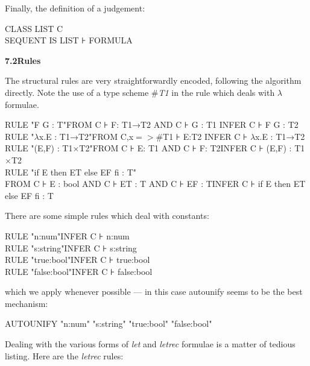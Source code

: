 Finally, the definition of a judgement:

CLASS LIST C\\
SEQUENT IS LIST ⊦ FORMULA


\textbf{7.2\tab Rules}


The structural rules are very straightforwardly encoded, following the algorithm directly. Note the use of a type scheme \#\textit{T1} in the rule which deals with \ensuremath{\lambda} formulae.

RULE "F G : T"\tab FROM C ⊦ F: T1→T2 AND C ⊦ G : T1 \tab INFER C ⊦ F G : T2\\
RULE "$\lambda$x.E : T1→T2"\tab FROM C,x$=>$\#T1 ⊦ E:T2 \tab INFER C ⊦ $\lambda$x.E : T1→T2\\
RULE "(E,F) : T1$\times$T2"\tab FROM C ⊦ E: T1 AND C ⊦ F: T2\tab INFER C ⊦ (E,F) : T1$\times$T2\\
RULE "if E then ET else EF fi : T"\\
\tab FROM C ⊦ E : bool AND C ⊦ ET : T AND C ⊦ EF : T\tab INFER C ⊦ if E then ET else EF fi : T


There are some simple rules which deal with constants:

RULE "n:num"\tab INFER C ⊦ n:num\\
RULE "s:string"\tab INFER C ⊦ s:string\\
RULE "true:bool"\tab INFER C ⊦ true:bool\\
RULE "false:bool"\tab INFER C ⊦ false:bool


which we apply whenever possible --- in this case autounify seems to be the best mechanism:

AUTOUNIFY "n:num" "s:string" "true:bool" "false:bool"


Dealing with the various forms of \textit{let} and \textit{letrec} formulae is a matter of tedious listing. Here are the \textit{letrec} rules:

